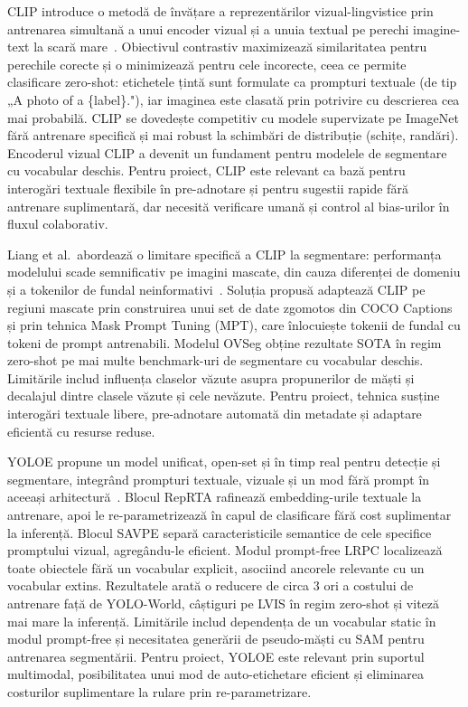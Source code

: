 CLIP introduce o metodă de învățare a reprezentărilor vizual-lingvistice prin antrenarea simultană a unui encoder vizual și a unuia textual pe perechi imagine-text la scară mare~\cite{radford2021learningtransferablevisualmodels}. Obiectivul contrastiv maximizează similaritatea pentru perechile corecte și o minimizează pentru cele incorecte, ceea ce permite clasificare zero-shot: etichetele țintă sunt formulate ca prompturi textuale (de tip „A photo of a \{label\}."), iar imaginea este clasată prin potrivire cu descrierea cea mai probabilă. CLIP se dovedește competitiv cu modele supervizate pe ImageNet fără antrenare specifică și mai robust la schimbări de distribuție (schițe, randări). Encoderul vizual CLIP a devenit un fundament pentru modelele de segmentare cu vocabular deschis. Pentru proiect, CLIP este relevant ca bază pentru interogări textuale flexibile în pre-adnotare și pentru sugestii rapide fără antrenare suplimentară, dar necesită verificare umană și control al bias-urilor în fluxul colaborativ.

Liang et al.\ abordează o limitare specifică a CLIP la segmentare: performanța modelului scade semnificativ pe imagini mascate, din cauza diferenței de domeniu și a tokenilor de fundal neinformativi~\cite{liang2023openvocabularysemanticsegmentationmaskadapted}. Soluția propusă adaptează CLIP pe regiuni mascate prin construirea unui set de date zgomotos din COCO Captions și prin tehnica Mask Prompt Tuning (MPT), care înlocuiește tokenii de fundal cu tokeni de prompt antrenabili. Modelul OVSeg obține rezultate SOTA în regim zero-shot pe mai multe benchmark-uri de segmentare cu vocabular deschis. Limitările includ influența claselor văzute asupra propunerilor de măști și decalajul dintre clasele văzute și cele nevăzute. Pentru proiect, tehnica susține interogări textuale libere, pre-adnotare automată din metadate și adaptare eficientă cu resurse reduse.

YOLOE propune un model unificat, open-set și în timp real pentru detecție și segmentare, integrând prompturi textuale, vizuale și un mod fără prompt în aceeași arhitectură~\cite{wang2025yoloerealtimeseeing}. Blocul RepRTA rafinează embedding-urile textuale la antrenare, apoi le re-parametrizează în capul de clasificare fără cost suplimentar la inferență. Blocul SAVPE separă caracteristicile semantice de cele specifice promptului vizual, agregându-le eficient. Modul prompt-free LRPC localizează toate obiectele fără un vocabular explicit, asociind ancorele relevante cu un vocabular extins. Rezultatele arată o reducere de circa 3 ori a costului de antrenare față de YOLO-World, câștiguri pe LVIS în regim zero-shot și viteză mai mare la inferență. Limitările includ dependența de un vocabular static în modul prompt-free și necesitatea generării de pseudo-măști cu SAM pentru antrenarea segmentării. Pentru proiect, YOLOE este relevant prin suportul multimodal, posibilitatea unui mod de auto-etichetare eficient și eliminarea costurilor suplimentare la rulare prin re-parametrizare.

